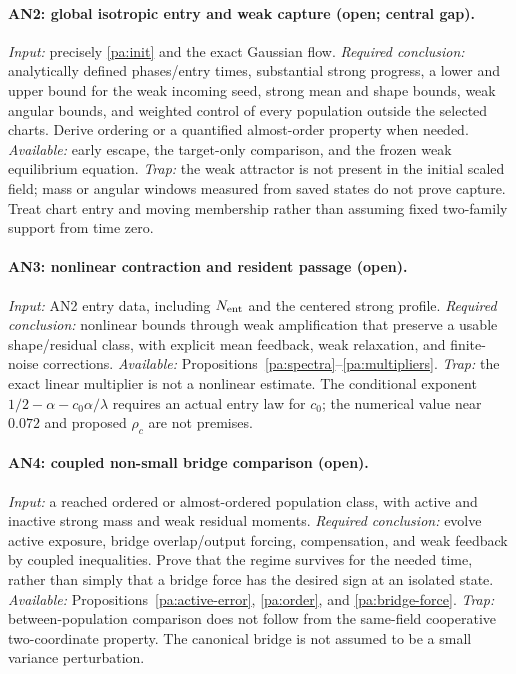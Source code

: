 \documentclass[11pt]{article}
\numberwithin{equation}{section}
\theoremstyle{definition}
\theoremstyle{remark}
\newcommand{\1}{\mathbf 1}
\begin{document}
\paragraph{AN2: global isotropic entry and weak capture (open; central gap).}
\emph{Input:} precisely \eqref{pa:init} and the exact Gaussian flow.
\emph{Required conclusion:} analytically defined phases/entry times,
substantial strong progress, a lower and upper bound for the weak incoming
seed, strong mean and shape bounds, weak angular bounds, and weighted
control of every population outside the selected charts. Derive ordering
or a quantified almost-order property when needed.
\emph{Available:} early escape, the target-only comparison, and the frozen
weak equilibrium equation. \emph{Trap:} the weak attractor is not present
in the initial scaled field; mass or angular windows measured from saved
states do not prove capture. Treat chart entry and moving membership
rather than assuming fixed two-family support from time zero.

\paragraph{AN3: nonlinear contraction and resident passage (open).}
\emph{Input:} AN2 entry data, including $N_{\rm ent}$ and the centered
strong profile. \emph{Required conclusion:} nonlinear bounds through weak
amplification that preserve a usable shape/residual class, with explicit
mean feedback, weak relaxation, and finite-noise corrections.
\emph{Available:} Propositions~\ref{pa:spectra}--\ref{pa:multipliers}.
\emph{Trap:} the exact linear multiplier is not a nonlinear estimate.
The conditional exponent
$1/2-\alpha-c_0\alpha/\lambda$ requires an actual entry law for $c_0$;
the numerical value near $0.072$ and proposed $\rho_c$ are not premises.

\paragraph{AN4: coupled non-small bridge comparison (open).}
\emph{Input:} a reached ordered or almost-ordered population class, with
active and inactive strong mass and weak residual moments.
\emph{Required conclusion:} evolve active exposure, bridge overlap/output
forcing, compensation, and weak feedback by coupled inequalities. Prove
that the regime survives for the needed time, rather than simply that a
bridge force has the desired sign at an isolated state.
\emph{Available:} Propositions~\ref{pa:active-error}, \ref{pa:order},
and \ref{pa:bridge-force}. \emph{Trap:} between-population comparison does
not follow from the same-field cooperative two-coordinate property.
The canonical bridge is not assumed to be a small variance perturbation.
\end{document}
